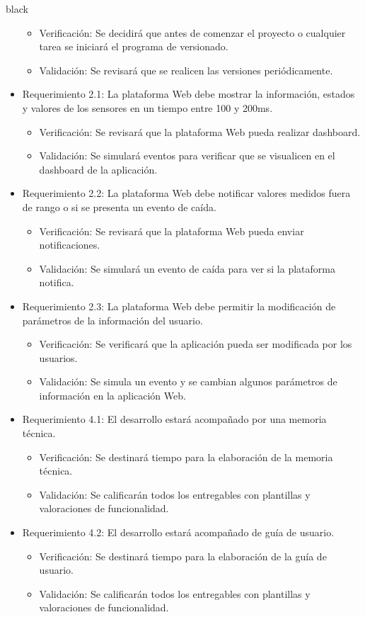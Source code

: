 \documentclass[11pt]{charter}
\begin{document}
\begin{consigna}{black}
\begin{itemize}
\begin{itemize}
\item Verificación: Se decidirá que antes de comenzar el proyecto o cualquier tarea se iniciará el programa de versionado.
\item Validación: Se revisará que se realicen las versiones periódicamente.  
\end{itemize}
\item Requerimiento 2.1: La plataforma Web debe mostrar la información, estados y valores de los sensores en un tiempo entre 100 y 200ms.
\begin{itemize}
\item Verificación: Se revisará que la plataforma Web pueda realizar dashboard.
\item Validación: Se simulará eventos para verificar que se visualicen en el dashboard de la aplicación.
\end{itemize}
\item Requerimiento 2.2: La plataforma Web debe notificar valores medidos fuera de rango o si se presenta un evento de caída.
\begin{itemize}
\item Verificación: Se revisará que la plataforma Web pueda enviar notificaciones.
\item Validación: Se simulará un evento de caída para ver si la plataforma notifica. 
\end{itemize}
\item Requerimiento 2.3: La plataforma Web debe permitir la modificación de parámetros de la información del usuario.
\begin{itemize}
\item Verificación: Se verificará que la aplicación pueda ser modificada por los usuarios.
\item Validación: Se simula un evento y se cambian algunos parámetros de información en la aplicación Web.
\end{itemize}
\item Requerimiento 4.1: El desarrollo estará acompañado por una memoria técnica.
\begin{itemize}
\item Verificación: Se destinará tiempo para la elaboración de la memoria técnica.
\item Validación: Se calificarán todos los entregables con plantillas y valoraciones de funcionalidad.
\end{itemize}
\item Requerimiento 4.2: El desarrollo estará acompañado de guía de usuario.
\begin{itemize}
\item Verificación: Se destinará tiempo para la elaboración de la guía de usuario.
\item Validación: Se calificarán todos los entregables con plantillas y valoraciones de funcionalidad.
\end{itemize}
\end{itemize}

\end{consigna}
\vspace{-10px}
\end{document}
